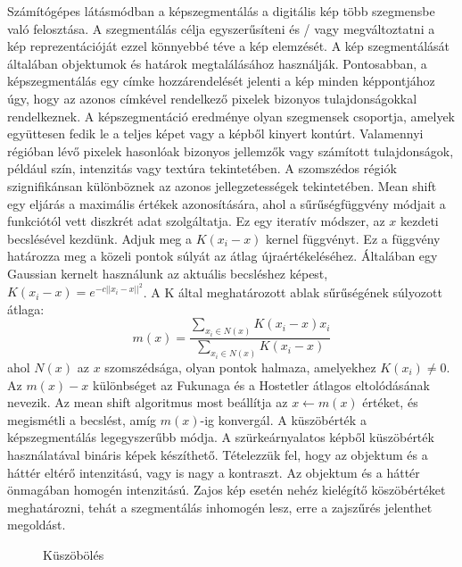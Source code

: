 Számítógépes látásmódban a képszegmentálás a digitális kép több szegmensbe való felosztása. A szegmentálás célja egyszerűsíteni és / vagy megváltoztatni a kép reprezentációját ezzel könnyebbé téve a kép elemzését. A kép szegmentálását általában objektumok és határok megtalálásához használják. Pontosabban, a képszegmentálás egy címke hozzárendelését jelenti a kép minden képpontjához úgy, hogy az azonos címkével rendelkező pixelek bizonyos tulajdonságokkal rendelkeznek. A képszegmentáció eredménye olyan szegmensek csoportja, amelyek együttesen fedik le a teljes képet vagy a képből kinyert kontúrt. Valamennyi régióban lévő pixelek hasonlóak bizonyos jellemzők vagy számított tulajdonságok, például szín, intenzitás vagy textúra tekintetében. A szomszédos régiók szignifikánsan különböznek az azonos jellegzetességek tekintetében.
Mean shift egy eljárás a maximális értékek azonosítására, ahol a sűrűségfüggvény módjait a funkciótól vett diszkrét adat szolgáltatja. Ez egy iteratív módszer, az $x$ kezdeti becslésével kezdünk. Adjuk meg a $K(x_i - x)$ kernel függvényt. Ez a függvény határozza meg a közeli pontok súlyát az átlag újraértékeléséhez. Általában egy Gaussian kernelt használunk az aktuális becsléshez képest, $K (x_i - x) = e ^ {- c || x_i - x || ^ 2}$. A K által meghatározott ablak sűrűségének súlyozott átlaga: 
$$m(x)=\frac{\sum_{x_i \in N(x)}K(x_i-x)x_i}{\sum_{x_i \in N(x)}K(x_i-x)}$$
ahol $N(x)$ az $x$ szomszédsága, olyan pontok halmaza, amelyekhez $K(x_ {i}) \neq 0$.\\
Az $m (x) -x$ különbséget az Fukunaga és a Hostetler átlagos eltolódásának nevezik. Az mean shift algoritmus most beállítja az $x \leftarrow m(x)$ értéket, és megismétli a becslést, amíg $m(x)$-ig konvergál.
A küszöbérték a képszegmentálás legegyszerűbb módja. A szürkeárnyalatos képből küszöbérték használatával bináris képek készíthető. Tételezzük fel, hogy az objektum és a háttér eltérő intenzitású, vagy is nagy a kontraszt. Az objektum és a háttér önmagában homogén intenzitású. Zajos kép esetén nehéz kielégítő köszöbértéket meghatározni, tehát a szegmentálás inhomogén lesz, erre a zajszűrés jelenthet megoldást. 
\begin{figure}[ht]
\centering
{}
\caption{Küszöbölés} 
\label{fig: gaussgorbe}
\end{figure}
\\\\
